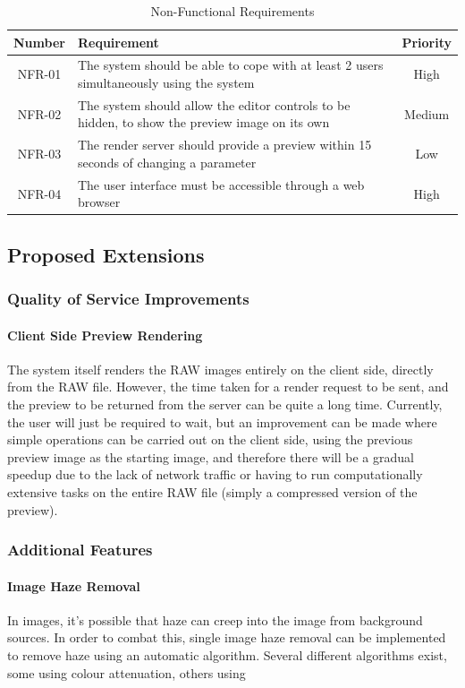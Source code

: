 \documentclass[12pt,a4paper]{article}
\begin{document}
\begin{table}
  \centering
  \begin{tabular}{| c | p{12cm} | c |}
    \hline
    \textbf{Number} & \textbf{Requirement} & \textbf{Priority} \\
    \hline
    NFR-01 & The system should be able to cope with at least 2 users simultaneously using the system & High \\
    \hline
    NFR-02 & The system should allow the editor controls to be hidden, to show the preview image on its own & Medium \\
    \hline
    NFR-03 & The render server should provide a preview within 15 seconds of changing a parameter & Low \\
    \hline
    NFR-04 & The user interface must be accessible through a web browser & High \\
    \hline
  \end{tabular}
  \caption{Non-Functional Requirements}
  \label{NFRTable}
\end{table}


\subsection{Proposed Extensions}
\subsubsection{Quality of Service Improvements}
\paragraph{Client Side Preview Rendering}
The system itself renders the RAW images entirely on the client side,
directly from the RAW file. However, the time taken for a render request to be sent,
and the preview to be returned from the server can be quite a long time. Currently,
the user will just be required to wait, but an improvement can be made where simple operations can be carried out on the client side, using the previous preview image as
the starting image, and therefore there will be a gradual speedup due to the lack of network traffic or having to run computationally extensive tasks on the entire RAW file (simply a compressed version of the preview).

\subsubsection{Additional Features}
\paragraph{Image Haze Removal}
In images, it's possible that haze can creep into the image from background sources.
In order to combat this, single image haze removal can be implemented to remove haze using an automatic algorithm.
Several different algorithms exist, some using colour attenuation, others using
\end{document}
